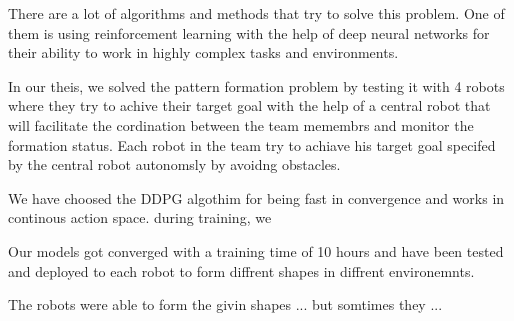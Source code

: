 \documentclass[12pt]{extarticle}
\begin{document}
There are a lot of algorithms and methods that try to solve this problem. One of them is using reinforcement learning with the help of deep neural networks for their ability to work in highly complex tasks and environments.

In our theis, we solved the pattern formation problem by testing it with 4 robots where they try to achive their target goal with the help of a central robot that will facilitate the cordination between the team memembrs and monitor the formation status. Each robot in the team try to achiave his target goal  specifed by the central robot autonomsly by avoidng obstacles. 



We have choosed the DDPG algothim for being fast in convergence and works in continous action space. during training, we  

Our models got converged with a training time of 10  hours and have been tested and deployed to each robot to form diffrent shapes in diffrent environemnts.
 
The robots were able to form the givin shapes ... but somtimes they ...
 
 
 
 





\newpage


\end{document}
